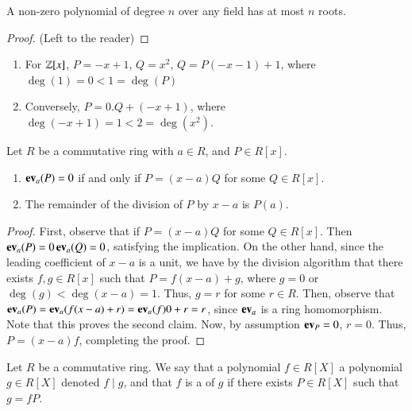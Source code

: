 \documentclass[12pt, a4paper, oneside, openright, titlepage]{book}
\begin{document}
\begin{cor}
    A non-zero polynomial of degree $n$ over any field has at most $n$ roots.
\end{cor}
\begin{proof}
    (Left to the reader)
\end{proof}


\begin{eg}
    \leavevmode
    \begin{enumerate}
        \item For $\mathbb Z[x]$, $P = -x+1$, $Q = x^2$, $Q = P(-x-1) + 1$, where $\deg(1) = 0 < 1 = \deg(P)$
        \item Conversely, $P = 0.Q + (-x+1)$, where $\deg(-x+1) = 1 < 2 = \deg(x^2)$.
    \end{enumerate}
\end{eg}

\begin{cor}
    Let $R$ be a commutative ring with $a \in R$, and $P \in R[x]$. \begin{enumerate}
        \item $\operatorname{\bf{ev}}_a(P) = 0$ if and only if $P = (x-a)Q$ for some $Q \in R[x]$.
        \item The remainder of the division of $P$ by $x-a$ is $P(a)$.
    \end{enumerate}
    \begin{proof}
        First, observe that if $P = (x-a)Q$ for some $Q \in R[x]$. Then $\operatorname{\bf{ev}}_a(P) = 0\operatorname{\bf{ev}}_a(Q) = 0$, satisfying the implication. On the other hand, since the leading coefficient of $x-a$ is a unit, we have by the division algorithm that there exists $f,g \in R[x]$ such that $P = f(x-a) + g$, where $g = 0$ or $\deg(g) < \deg(x-a) = 1$. Thus, $g = r$ for some $r \in R$. Then, observe that $\operatorname{\bf{ev}}_a(P) = \operatorname{\bf{ev}}_a(f(x-a) + r) = \operatorname{\bf{ev}}_a(f)0+r = r$, since $\operatorname{\bf{ev}}_a$ is a ring homomorphism. Note that this proves the second claim. Now, by assumption $\operatorname{\bf{ev}}_P = 0$, $r = 0$. Thus, $P = (x-a)f$, completing the proof.
    \end{proof}
\end{cor}


\begin{defn}
    Let $R$ be a commutative ring. We say that a polynomial $f \in R[X]$  a polynomial $g \in R[X]$ denoted $f\;\vert\;g$, and that $f$ is a  of $g$ if there exists $P \in R[X]$ such that $g = fP$.
\end{defn}
\end{document}
